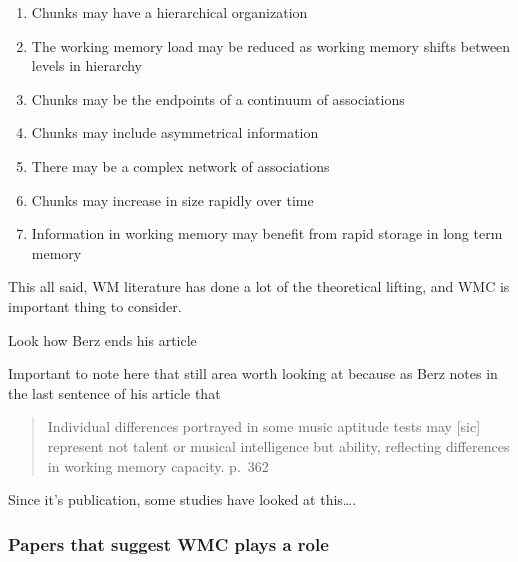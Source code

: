 \documentclass[]{book}
\theoremstyle{definition}
\theoremstyle{definition}
\theoremstyle{definition}
\theoremstyle{remark}
\begin{document}
\begin{enumerate}
\def\labelenumi{\arabic{enumi}.}
\item
  Chunks may have a hierarchical organization
\item
  The working memory load may be reduced as working memory shifts
  between levels in hierarchy
\item
  Chunks may be the endpoints of a continuum of associations
\item
  Chunks may include asymmetrical information
\item
  There may be a complex network of associations
\item
  Chunks may increase in size rapidly over time
\item
  Information in working memory may benefit from rapid storage in long
  term memory
\end{enumerate}

This all said, WM literature has done a lot of the theoretical lifting,
and WMC is important thing to consider.

Look how Berz ends his article

Important to note here that still area worth looking at because as Berz
notes in the last sentence of his article that

\begin{quote}
Individual differences portrayed in some music aptitude tests may
{[}sic{]} represent not talent or musical intelligence but ability,
reflecting differences in working memory capacity. p.~362
\end{quote}

Since it's publication, some studies have looked at this\ldots{}.

\hypertarget{papers-that-suggest-wmc-plays-a-role}{%
\subsubsection{Papers that suggest WMC plays a
role}\label{papers-that-suggest-wmc-plays-a-role}}
\end{document}
